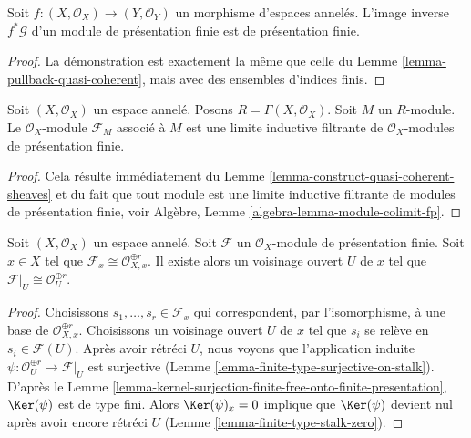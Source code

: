 \begin{lemma}
\label{lemma-pullback-finite-presentation}
Soit $f : (X, \mathcal{O}_X) \to (Y, \mathcal{O}_Y)$
un morphisme d'espaces annelés.
L'image inverse $f^*\mathcal{G}$ d'un module de présentation finie
est de présentation finie.
\end{lemma}

\begin{proof}
La démonstration est exactement la même que celle du Lemme
\ref{lemma-pullback-quasi-coherent}, mais avec des ensembles d'indices finis.
\end{proof}

\begin{lemma}
\label{lemma-quasi-coherent-limit-finite-presentation}
Soit $(X, \mathcal{O}_X)$ un espace annelé.
Posons $R = \Gamma(X, \mathcal{O}_X)$.
Soit $M$ un $R$-module.
Le $\mathcal{O}_X$-module $\mathcal{F}_M$ associé à $M$
est une limite inductive filtrante de $\mathcal{O}_X$-modules de présentation
finie.
\end{lemma}

\begin{proof}
Cela résulte immédiatement du
Lemme \ref{lemma-construct-quasi-coherent-sheaves}
et du fait que tout module est une limite inductive filtrante
de modules de présentation finie, voir
Algèbre, Lemme \ref{algebra-lemma-module-colimit-fp}.
\end{proof}

\begin{lemma}
\label{lemma-finite-presentation-stalk-free}
Soit $(X, \mathcal{O}_X)$ un espace annelé. Soit $\mathcal{F}$ un
$\mathcal{O}_X$-module de présentation finie. Soit $x \in X$ tel que
$\mathcal{F}_x \cong \mathcal{O}_{X, x}^{\oplus r}$. Il existe alors
un voisinage ouvert $U$ de $x$ tel que
$\mathcal{F}|_U \cong \mathcal{O}_U^{\oplus r}$.
\end{lemma}

\begin{proof}
Choisissons $s_1, \ldots, s_r \in \mathcal{F}_x$ qui correspondent, par
l'isomorphisme, à une base de $\mathcal{O}_{X, x}^{\oplus r}$. Choisissons un
voisinage ouvert $U$ de $x$ tel que $s_i$ se relève en
$s_i \in \mathcal{F}(U)$. Après avoir rétréci $U$, nous voyons que
l'application induite $\psi : \mathcal{O}_U^{\oplus r} \to \mathcal{F}|_U$
est surjective (Lemme \ref{lemma-finite-type-surjective-on-stalk}).
D'après le Lemme
\ref{lemma-kernel-surjection-finite-free-onto-finite-presentation},
$\Ker(\psi)$ est de type fini.
Alors $\Ker(\psi)_x = 0$ implique que $\Ker(\psi)$ devient nul
après avoir encore rétréci $U$ (Lemme \ref{lemma-finite-type-stalk-zero}).
\end{proof}

